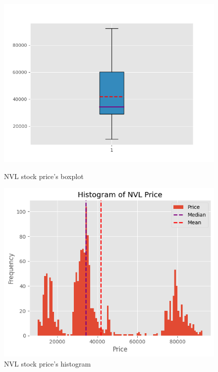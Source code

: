 \documentclass{ieeeojies}
\begin{document}
\begin{figure}[H]
    \centering
    \begin{minipage}{0.23\textwidth}
    \centering
    \includegraphics[width=1\textwidth]{Boxplot_NVL.png}
    \caption{NVL stock price's boxplot}
    \label{fig:1}
    \end{minipage}
    \hfill
    \begin{minipage}{0.23\textwidth}
    \centering
    \includegraphics[width=1\textwidth]{Histogram NVL.png}
    \caption{NVL stock price's histogram}
    \label{fig:2}
    \end{minipage}
\end{figure}
\end{document}
